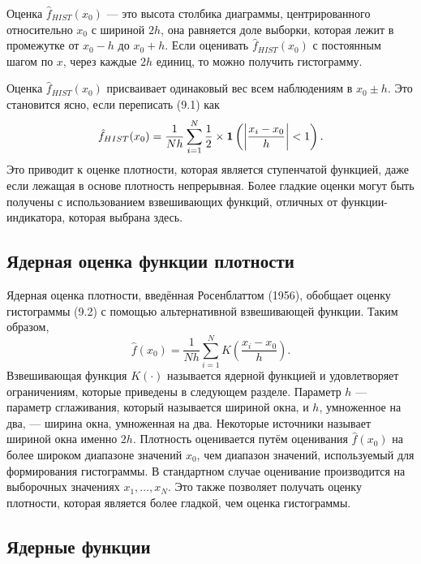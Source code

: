 Оценка $\hat{f}_{HIST}(x_0)$ --- это высота столбика диаграммы, центрированного относительно $x_0$ с шириной $2h$, она равняется доле выборки, которая лежит в промежутке от $x_0 - h$ до $x_0 + h$. Если оценивать $\hat{f}_{HIST}(x_0)$ с постоянным шагом по $x$, через каждые $2h$ единиц, то можно получить гистограмму. 

Оценка $\hat{f}_{HIST}(x_0)$ присваивает одинаковый вес всем наблюдениям в $x_0 \pm h$. Это становится ясно, если переписать (9.1) как
\begin{equation}
\hat{f}_{HIST}(x_0) = \frac{1}{Nh} \sum_{i=1}^N \frac{1}{2} \times {\bf{1}} \left( \left|\frac{x_i - x_0}{h}\right| < 1 \right).
\end{equation}
Это приводит к оценке плотности, которая является ступенчатой функцией, даже если лежащая в основе плотность непрерывная. Более гладкие оценки могут быть получены с использованием взвешивающих функций, отличных от функции-индикатора, которая выбрана здесь.

\subsection{Ядерная оценка функции плотности}

Ядерная оценка плотности, введённая Росенблаттом (1956), обобщает оценку гистограммы (9.2) с помощью альтернативной взвешивающей функции. Таким образом,
\begin{equation}
\hat{f}(x_0) =  \frac{1}{Nh} \sum_{i=1}^N  K \left( \frac{x_i - x_0}{h} \right).
\end{equation}
Взвешивающая функция $K(\cdot)$ называется ядерной функцией и удовлетворяет ограничениям, которые приведены в следующем разделе. Параметр $h$ --- параметр сглаживания, который называется шириной окна, и $h$, умноженное на два, --- ширина окна, умноженная на два. Некоторые источники называет шириной окна именно $2h$. Плотность оценивается путём оценивания $\hat{f}(x_0)$ на более широком диапазоне значений $x_0$, чем диапазон значений, используемый для формирования гистограммы. В стандартном случае оценивание производится на выборочных значениях $x_1, \dots, x_N$. Это также позволяет получать оценку плотности, которая является более гладкой, чем оценка гистограммы.

\subsection{Ядерные функции}

